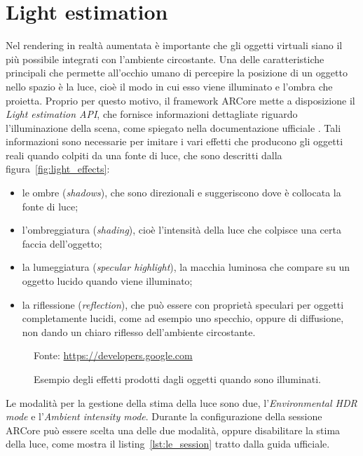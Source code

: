 \documentclass[crop=false, class=book]{standalone}
\begin{document}
	\section{Light estimation}
	Nel rendering in realtà aumentata è importante che gli oggetti virtuali siano il più possibile integrati con l'ambiente circostante. Una delle caratteristiche principali che permette all'occhio umano di percepire la posizione di un oggetto nello spazio è la luce, cioè il modo in cui esso viene illuminato e l'ombra che proietta. 
	Proprio per questo motivo, il framework ARCore mette a disposizione il \textit{Light estimation API}, che fornisce informazioni dettagliate riguardo l'illuminazione della scena, come spiegato nella documentazione ufficiale \cite{google2022light}.
	Tali informazioni sono necessarie per imitare i vari effetti che producono gli oggetti reali quando colpiti da una fonte di luce, che sono descritti dalla figura~\vref{fig:light_effects}:
	\begin{itemize}
		\item le ombre (\textit{shadows}), che sono direzionali e suggeriscono dove è collocata la fonte di luce;
		\item l'ombreggiatura (\textit{shading}), cioè l'intensità della luce che colpisce una certa faccia dell'oggetto;
		\item la lumeggiatura (\textit{specular highlight}), la macchia luminosa che compare su un oggetto lucido quando viene illuminato;
		\item la riflessione (\textit{reflection}), che può essere con proprietà speculari per oggetti completamente lucidi, come ad esempio uno specchio, oppure di diffusione, non dando un chiaro riflesso dell'ambiente circostante. 
	\end{itemize}
	
	\begin{figure}
		\centering
			{Fonte: \url{https://developers.google.com}}
		\caption{Esempio degli effetti prodotti dagli oggetti quando sono illuminati.}
		\label{fig:light_effects}
	\end{figure}
    \noindent
	Le modalità per la gestione della stima della luce sono due, l'\textit{Environmental HDR mode} e l'\textit{Ambient intensity mode}. Durante la configurazione della sessione ARCore può essere scelta una delle due modalità, oppure disabilitare la stima della luce, come mostra il listing~\vref{lst:le_session} tratto dalla guida ufficiale.
	\\
	
\end{document}
